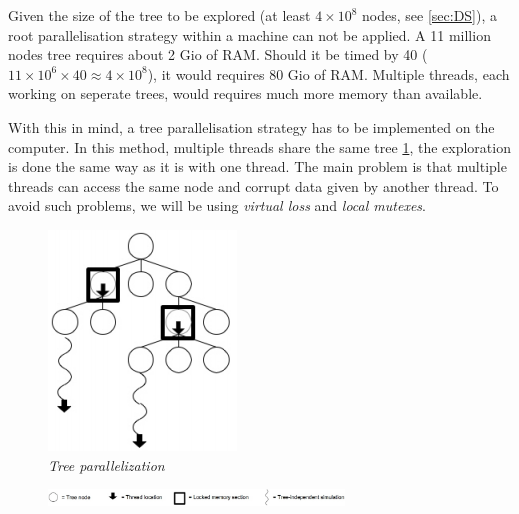 Given the size of the tree to be explored (at least \ensuremath{4 \times 10^8} nodes, see \ref{sec:DS}), a root parallelisation strategy within a machine can not be applied. A 11 million nodes tree requires about 2 Gio of RAM. Should it be timed by 40 (\ensuremath{11 \times 10^6 \times 40 \approx 4 \times 10^8}), it would requires 80 Gio of RAM. Multiple threads, each working on seperate trees, would requires much more memory than available.
	

With this in mind, a tree parallelisation strategy has to be implemented on the computer. In this method, multiple threads share the same tree \ref{fig:TreeParallelization}, the exploration is done the same way as it is with one thread. The main problem is that multiple threads can access the same node and corrupt data given by another thread. To avoid such problems, we will be using \textit{virtual loss} and \textit{local mutexes}.

\begin{figure}[H]
\centerline{\includegraphics[]{Parallelisation/Computer/Img/Tree.png}}
\caption{\label{fig:TreeParallelization}\textit{Tree parallelization}}
\end{figure}
\begin{figure}[H]
\centerline{\includegraphics[width=0.7\textwidth]{Parallelisation/Computer/Img/legend.png}}
\end{figure}

